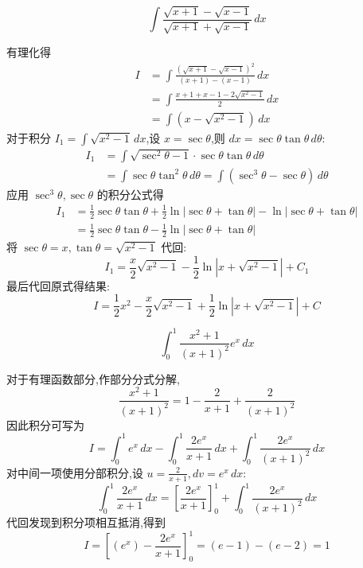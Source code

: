 \begin{questions}
    \question 
    \[
    \int \frac{\sqrt{x+1} - \sqrt{x-1}}{\sqrt{x+1} + \sqrt{x-1}} \, dx
    \]
    \begin{solution}
        有理化得
        \begin{align*}
        I &= \int \frac{(\sqrt{x+1} - \sqrt{x-1})^2}{(x+1) - (x-1)} \, dx \\
        &= \int \frac{x+1 + x-1 - 2\sqrt{x^2-1}}{2} \, dx \\
        &= \int (x - \sqrt{x^2-1}) \, dx
        \end{align*}
        对于积分 $I_1 = \int \sqrt{x^2-1} \, dx$,设 $x = \sec\theta$,则 $dx = \sec\theta\tan\theta \, d\theta$:
        \begin{align*}
        I_1 &= \int \sqrt{\sec^2\theta - 1} \cdot \sec\theta\tan\theta \, d\theta \\
        &= \int \sec\theta \tan^2\theta \, d\theta = \int (\sec^3\theta - \sec\theta) \, d\theta
        \end{align*}
        应用 $\sec^3\theta,\sec\theta$ 的积分公式得
        \begin{align*}
        I_1 &= \frac{1}{2}\sec\theta\tan\theta + \frac{1}{2}\ln|\sec\theta + \tan\theta| - \ln|\sec\theta + \tan\theta| \\
        &= \frac{1}{2}\sec\theta\tan\theta - \frac{1}{2}\ln|\sec\theta + \tan\theta|
        \end{align*}
        将 $\sec\theta = x, \tan\theta = \sqrt{x^2-1}$ 代回:
        \[
        I_1 = \frac{x}{2}\sqrt{x^2-1} - \frac{1}{2}\ln|x + \sqrt{x^2-1}| + C_1
        \]
        最后代回原式得结果:
        \[
        I = \frac{1}{2}x^2 - \frac{x}{2}\sqrt{x^2-1} + \frac{1}{2} \ln|x + \sqrt{x^2-1}| + C
        \]
    \end{solution}

    \question
    \[
    \int_{0}^{1} \frac{x^2+1}{(x+1)^2} e^x \, dx
    \]
    \begin{solution}
        对于有理函数部分,作部分分式分解,
        \[
        \frac{x^2+1}{(x+1)^2} = 1 - \frac{2}{x+1} + \frac{2}{(x+1)^2}
        \]
        因此积分可写为
        \[
        I=\int_{0}^{1} e^x \, dx - \int_{0}^{1} \frac{2 e^x}{x+1} \, dx + \int_{0}^{1} \frac{2 e^x}{(x+1)^2} \, dx
        \]
        对中间一项使用分部积分,设 $u = \frac{2}{x+1}, dv = e^x \, dx$:
        \[
        \int_{0}^{1} \frac{2 e^x}{x+1} \, dx = \left[ \frac{2 e^x}{x+1} \right]_{0}^{1} + \int_{0}^{1} \frac{2 e^x}{(x+1)^2} \, dx
        \]
        代回发现到积分项相互抵消,得到
        \[
        I= \left[(e^x) - \frac{2 e^x}{x+1} \right]_{0}^{1} = (e - 1) - (e - 2) = 1
        \]
    \end{solution}


\end{questions}
